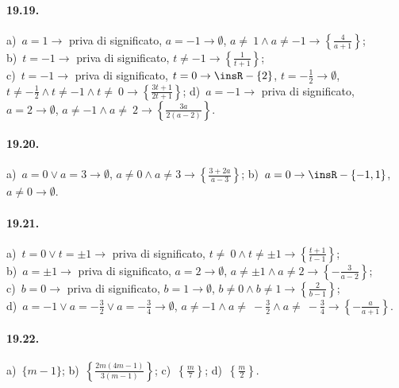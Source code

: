 \paragraph{19.19.}
a)~$a=1 \rightarrow$ priva di significato, $a=-1 \rightarrow \emptyset$, $a\neq~1\wedge a\neq -1 \rightarrow \left\{\frac{4}{a+1}\right\}$;
\protect\\ b)~$t=-1 \rightarrow$ priva di significato, $t\neq -1 \rightarrow \left\{\frac{1}{t+1}\right\}$;
\protect\\ c)~$t=-1 \rightarrow$ priva di significato, $t=0 \rightarrow \insR-\{2\}$, $t=-{\frac{1}{2}} \rightarrow \emptyset$, $t\neq -\frac{1}{2}\wedge t\neq -1\wedge t\neq~0 \rightarrow \left\{\frac{3t+1}{2t+1}\right\}$;
\quad d)~$a=-1 \rightarrow$ priva di significato, $a=2 \rightarrow \emptyset$, $a\neq -1\wedge a\neq~2 \rightarrow \left\{\frac{3a}{2(a-2)}\right\}$.

\paragraph{19.20.}
a)~$a=0 \vee a=3 \rightarrow \emptyset$, $a\neq 0 \wedge a\neq 3 \rightarrow \left\{\frac{3+2a}{a-3}\right\}$;
\quad b)~$a=0 \rightarrow \insR-\{-1,1\}$, $a\neq 0 \rightarrow \emptyset$.

\paragraph{19.21.}
a)~$t=0 \vee t=\pm 1 \rightarrow$ priva di significato, $t\neq~0\wedge t\neq \pm 1 \rightarrow \left\{\frac{t+1}{t-1}\right\}$;
\protect\\ b)~$a=\pm 1 \rightarrow$ priva di significato, $a=2 \rightarrow \emptyset$, $a\neq \pm 1 \wedge a\neq 2 \rightarrow \left\{-\frac{3}{a-2}\right\}$;
\protect\\ c)~$b=0 \rightarrow$ priva di significato, $b=1 \rightarrow \emptyset$, $b\neq 0\wedge b\neq 1 \rightarrow \left\{\frac{2}{b-1}\right\}$;
\protect\\ d)~$a=-1 \vee a=-\frac{3}{2}\vee a=-\frac{3}{4}\rightarrow \emptyset$, $a\neq -1\wedge a\neq~-\frac{3}{2}\wedge a\neq~-\frac{3}{4} \rightarrow \left\{-\frac{a}{a+1}\right\}$.

\paragraph{19.22.} %
a)~$\{m-1\}$; \quad b)~$\left\{\frac{2m(4m-1)}{3(m-1)}\right\}$; \quad c)~$\left\{\frac{m}{7}\right\}$;
\quad d)~$\left\{\frac{m}{2}\right\}$.


